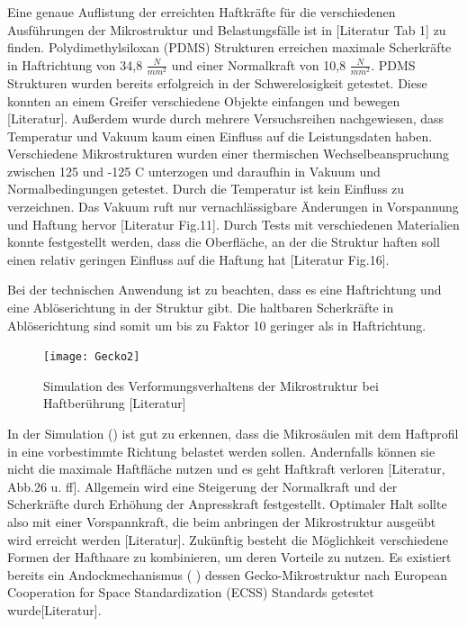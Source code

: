 	Eine genaue Auflistung der erreichten Haftkräfte für die verschiedenen Ausführungen der Mikrostruktur und Belastungsfälle ist in [Literatur Tab 1] zu finden.
Polydimethylsiloxan (PDMS) Strukturen erreichen maximale Scherkräfte in Haftrichtung von 34,8 $\frac{N}{mm^{2}}$ und einer Normalkraft von 10,8 $\frac{N}{mm^{2}}$.
PDMS Strukturen wurden bereits erfolgreich in der Schwerelosigkeit getestet. Diese konnten an einem Greifer verschiedene Objekte einfangen und bewegen [Literatur]. Außerdem wurde durch mehrere Versuchsreihen nachgewiesen, dass Temperatur und Vakuum kaum einen Einfluss auf die Leistungsdaten haben. Verschiedene Mikrostrukturen wurden einer thermischen Wechselbeanspruchung zwischen 125 und  -125 \textdegree{} C unterzogen und daraufhin in Vakuum und Normalbedingungen getestet. Durch die Temperatur ist kein Einfluss zu verzeichnen. Das Vakuum ruft nur vernachlässigbare Änderungen in Vorspannung und Haftung hervor [Literatur Fig.11]. Durch Tests mit verschiedenen Materialien konnte festgestellt werden, dass die Oberfläche, an der die Struktur haften soll einen relativ geringen Einfluss auf die Haftung hat [Literatur Fig.16]. 

Bei der technischen Anwendung ist zu beachten, dass es eine Haftrichtung und eine Ablöserichtung in der Struktur gibt. Die haltbaren Scherkräfte in Ablöserichtung sind somit um bis zu Faktor 10 geringer als in Haftrichtung.
\begin{figure}[h]
	\centering
		\texttt{[image: Gecko2]}
	\caption{Simulation des Verformungsverhaltens der Mikrostruktur bei Haftberührung [Literatur]}
	\label{fig:Gecko2}
\end{figure}	


In der Simulation () ist gut zu erkennen, dass die Mikrosäulen mit dem Haftprofil in eine vorbestimmte Richtung belastet werden sollen. Andernfalls können sie nicht die maximale Haftfläche nutzen und es geht Haftkraft verloren [Literatur, Abb.26 u. ff]. 
Allgemein wird eine Steigerung der Normalkraft und der Scherkräfte durch Erhöhung der Anpresskraft festgestellt. Optimaler Halt sollte also mit einer Vorspannkraft, die beim anbringen der Mikrostruktur ausgeübt wird erreicht werden [Literatur].  Zukünftig besteht die Möglichkeit verschiedene Formen der Hafthaare zu kombinieren, um deren Vorteile zu nutzen. 
Es existiert bereits ein Andockmechanismus ( ) dessen Gecko-Mikrostruktur nach  European Cooperation for Space Standardization (ECSS) Standards getestet wurde[Literatur]. 


